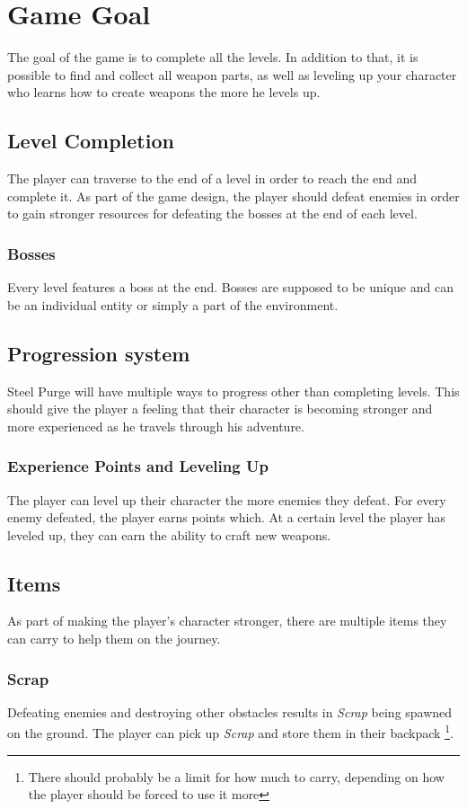 \documentclass[../Main.tex]{subfiles}
\begin{document}
\section{Game Goal}

The goal of the game is to complete all the levels. In addition to that, it is possible to find and collect all weapon parts, as well as leveling up your character who learns how to create weapons the more he levels up. 

\subsection{Level Completion}

The player can traverse to the end of a level in order to reach the end and complete it. As part of the game design, the player should defeat enemies in order to gain stronger resources for defeating the bosses at the end of each level.

\subsubsection{Bosses}

Every level features a boss at the end. Bosses are supposed to be unique and can be an individual entity or simply a part of the environment.

\subsection{Progression system}

Steel Purge will have multiple ways to progress other than completing levels. This should give the player a feeling that their character is becoming stronger and more experienced as he travels through his adventure.

\subsubsection{Experience Points and Leveling Up}

The player can level up their character the more enemies they defeat. For every enemy defeated, the player earns points which. At a certain level the player has leveled up, they can earn the ability to craft new weapons.

\subsection{Items}

As part of making the player's character stronger, there are multiple items they can carry to help them on the journey.

\subsubsection{Scrap}

Defeating enemies and destroying other obstacles results in \emph{Scrap} being spawned on the ground. The player can pick up \emph{Scrap} and store them in their backpack \footnote{There should probably be a limit for how much to carry, depending on how the player should be forced to use it more}. 
\end{document}
